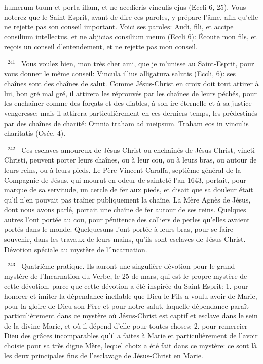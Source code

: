 \documentclass[paper=a5,pagesize=pdftex,fontsize=15pt,headinclude=on,twoside=off]{scrbook}
\newcommand{\negphantom}[1]{\settowidth{\dimen0}{#1}\hspace*{-\dimen0}}
\newcommand{\versenb}[1]{\par \vspace{10pt}~\negphantom{~${}^{#1}$~}${}^{#1}$~}
\begin{document}
humerum tuum et porta illam, et ne acedieris vinculis ejus (Eccli 6, 25). Vous noterez que le Saint-Esprit, avant de
dire ces paroles, y prépare l'âme, afin qu'elle ne rejette pas son conseil important. Voici ses paroles: Audi, fili, et
accipe consilium intellectus, et ne abjicias consilium meum (Eccli 6): Écoute mon fils, et reçois un conseil
d'entendement, et ne rejette pas mon conseil.
\versenb{241} Vous voulez bien, mon très cher ami, que je m'unisse au Saint-Esprit, pour vous donner le même conseil:
Vincula illius alligatura salutis (Eccli, 6): ses chaînes sont des chaînes de salut. Comme Jésus-Christ en croix doit
tout attirer à lui, bon gré mal gré, il attirera les réprouvés par les chaînes de leurs péchés, pour les enchaîner
comme des forçats et des diables, à son ire éternelle et à sa justice vengeresse; mais il attirera particulièrement en
ces derniers temps, les prédestinés par des chaînes de charité: Omnia traham ad meipsum. Traham eos in vinculis
charitatis (Osée, 4).
\versenb{242} Ces esclaves amoureux de Jésus-Christ ou enchaînés de Jésus-Christ, vincti Christi, peuvent porter leurs
chaînes, ou à leur cou, ou à leurs bras, ou autour de leurs reins, ou à leurs pieds. Le Père Vincent Caraffa,
septième général de la Compagnie de Jésus, qui mourut en odeur de sainteté l'an 1643, portait, pour marque de
sa servitude, un cercle de fer aux pieds, et disait que sa douleur était qu'il n'en pouvait pas traîner publiquement la
chaîne. La Mère Agnès de Jésus, dont nous avons parlé, portait une chaîne de fer autour de ses reins. Quelques
autres l'ont portée au cou, pour pénitence des colliers de perles qu'elles avaient portés dans le monde. Quelquesuns l'ont portée à leurs bras, pour se faire souvenir, dans les travaux de leurs mains, qu'ils sont esclaves de Jésus Christ.
Dévotion spéciale au mystère de l'lncarnation.
\versenb{243} Quatrième pratique. Ils auront une singulière dévotion pour le grand mystère de l'Incarnation du Verbe, le 25
de mars, qui est le propre mystère de cette dévotion, parce que cette dévotion a été inspirée du Saint-Esprit: 1.
pour honorer et imiter la dépendance ineffable que Dieu le Fils a voulu avoir de Marie, pour la gloire de Dieu son
Père et pour notre salut, laquelle dépendance paraît particulièrement dans ce mystère où Jésus-Christ est captif et
esclave dans le sein de la divine Marie, et où il dépend d'elle pour toutes choses; 2. pour remercier Dieu des
grâces incomparables qu'il a faites à Marie et particulièrement de l'avoir choisie pour sa très digne Mère, lequel
choix a été fait dans ce mystère: ce sont là les deux principales fins de l'esclavage de Jésus-Christ en Marie.
\end{document}
